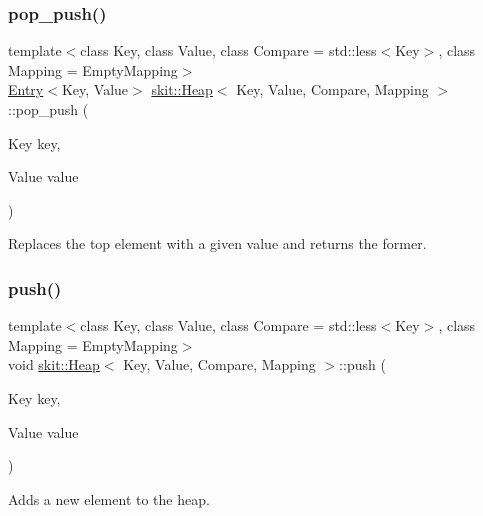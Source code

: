 \subsubsection{\texorpdfstring{pop\+\_\+push()}{pop\_push()}}
{\footnotesize\ttfamily template$<$class Key, class Value, class Compare = std\+::less$<$\+Key$>$, class Mapping = Empty\+Mapping$>$ \\
\hyperlink{structskit_1_1Entry}{Entry}$<$Key, Value$>$ \hyperlink{classskit_1_1Heap}{skit\+::\+Heap}$<$ Key, Value, Compare, Mapping $>$\+::pop\+\_\+push (\begin{DoxyParamCaption}\item[{Key}]{key,  }\item[{Value}]{value }\end{DoxyParamCaption})\hspace{0.3cm}{\ttfamily [inline]}}



Replaces the top element with a given value and returns the former. 

\mbox{\label{classskit_1_1Heap_a70915cf2b9b4b495bb145ac0e32f5a17}} 
\subsubsection{\texorpdfstring{push()}{push()}}
{\footnotesize\ttfamily template$<$class Key, class Value, class Compare = std\+::less$<$\+Key$>$, class Mapping = Empty\+Mapping$>$ \\
void \hyperlink{classskit_1_1Heap}{skit\+::\+Heap}$<$ Key, Value, Compare, Mapping $>$\+::push (\begin{DoxyParamCaption}\item[{Key}]{key,  }\item[{Value}]{value }\end{DoxyParamCaption})\hspace{0.3cm}{\ttfamily [inline]}}



Adds a new element to the heap. 

\mbox{\label{classskit_1_1Heap_afb1f1b5ed8b5d74aee731f45729025f7}} 
